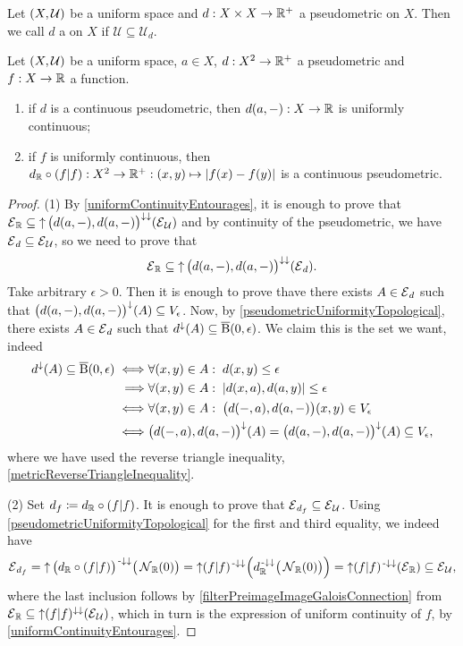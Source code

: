 \begin{definition}
Let $\left( X, \mathcal{U} \right)$ be a uniform space and $d: X\times X\to \mathbb{R}^+$ a pseudometric on $X$. Then we call $d$ a  on $X$ if $\mathcal{U}\subseteq \mathcal{U}_d$.
\end{definition}

\begin{proposition} \label{continuousPseudometricFunctionLemma}
Let $\left( X, \mathcal{U} \right)$ be a uniform space, $a\in X$, $d: X^2\to \mathbb{R}^+$ a pseudometric and $f: X\to \mathbb{R}$ a function.
\begin{enumerate}
\item if $d$ is a continuous pseudometric, then $d(a, -): X\to \mathbb{R}$ is uniformly continuous;
\item if $f$ is uniformly continuous, then $d_{\mathbb{R}}\circ (f|f): X^2\to \mathbb{R}^+: (x,y)\mapsto |f(x)- f(y)|$ is a continuous pseudometric.
\end{enumerate}
\end{proposition}
\begin{proof}
(1) By \ref{uniformContinuityEntourages}, it is enough to prove that $\operatorname{\mathcal{E}}_{\mathbb{R}} \subseteq \operatorname{\uparrow} \big(d(a, -), d(a,-)\big)^{\downarrow\downarrow}(\operatorname{\mathcal{E}}_\mathcal{U})$ and by continuity of the pseudometric, we have $\operatorname{\mathcal{E}}_d \subseteq \operatorname{\mathcal{E}}_{\mathcal{U}}$, so we need to prove that
\[ \operatorname{\mathcal{E}}_{\mathbb{R}} \subseteq \operatorname{\uparrow} \big(d(a, -), d(a,-)\big)^{\downarrow\downarrow}(\operatorname{\mathcal{E}}_d). \]
Take arbitrary $\epsilon>0$. Then it is enough to prove thave there exists $A\in \operatorname{\mathcal{E}}_d$ such that $\big(d(a, -), d(a,-)\big)^{\downarrow}(A) \subseteq V_\epsilon$. Now, by \ref{pseudometricUniformityTopological}, there exists $A\in \operatorname{\mathcal{E}}_d$ such that $d^{\downarrow}(A)\subseteq \operatorname{\overline{B}}(0,\epsilon)$. We claim this is the set we want, indeed
\begin{align*}
d^{\downarrow}(A)\subseteq \operatorname{\overline{B}}(0,\epsilon) \iff& \forall (x,y)\in A: \; d(x,y) \leq \epsilon \\
\implies& \forall (x,y)\in A: \; |d(x,a), d(a,y)| \leq \epsilon \\
\iff& \forall (x,y)\in A: \; \big(d(-,a), d(a,-)\big)(x,y) \in V_\epsilon \\
\iff& \big(d(-,a), d(a,-)\big)^\downarrow(A) = \big(d(a,-), d(a,-)\big)^\downarrow(A) \subseteq V_\epsilon,
\end{align*}
where we have used the reverse triangle inequality, \ref{metricReverseTriangleInequality}.

(2) Set $d_f \coloneqq d_{\mathbb{R}}\circ(f|f)$. It is enough to prove that $\operatorname{\mathcal{E}}_{d_f}\subseteq \operatorname{\mathcal{E}}_\mathcal{U}$. Using \ref{pseudometricUniformityTopological} for the first and third equality, we indeed have
\[ \operatorname{\mathcal{E}}_{d_f} = \operatorname{\uparrow} \big(d_{\mathbb{R}}\circ (f|f)\big)^{{\text{\hspace{0.15em}-}\downarrow}\downarrow}\big(\operatorname{\mathcal{N}}_{\mathbb{R}}(0)\big) = \operatorname{\uparrow} (f|f)^{{\text{\hspace{0.15em}-}\downarrow}\downarrow}\Big(d_{\mathbb{R}}^{{\text{\hspace{0.15em}-}\downarrow}\downarrow}\big(\operatorname{\mathcal{N}}_{\mathbb{R}}(0)\big)\Big) = \operatorname{\uparrow} (f|f)^{{\text{\hspace{0.15em}-}\downarrow}\downarrow}(\operatorname{\mathcal{E}}_{\mathbb{R}}) \subseteq \operatorname{\mathcal{E}}_\mathcal{U}, \]
where the last inclusion follows by \ref{filterPreimageImageGaloisConnection} from $\operatorname{\mathcal{E}}_{\mathbb{R}} \subseteq \operatorname{\uparrow} (f|f)^{\downarrow\downarrow}(\operatorname{\mathcal{E}}_\mathcal{U})$, which in turn is the expression of uniform continuity of $f$, by \ref{uniformContinuityEntourages}.
\end{proof}

